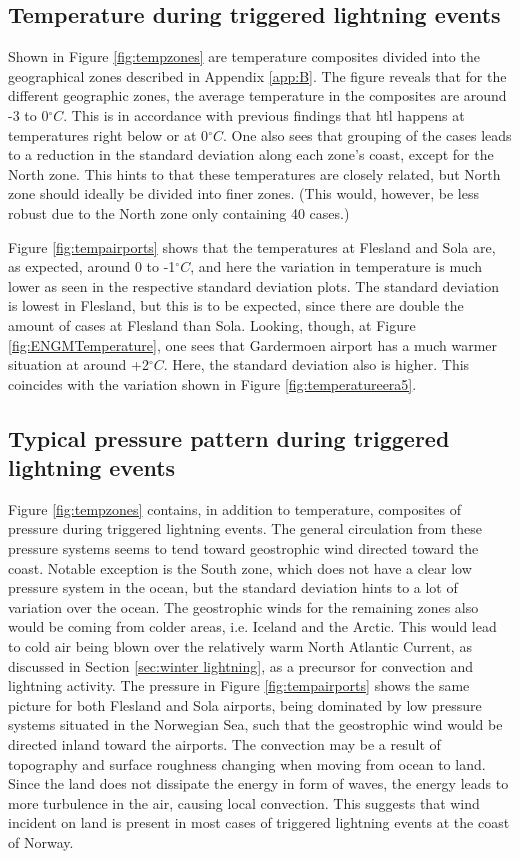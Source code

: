 \subsection{Temperature during triggered lightning events}
Shown in Figure \ref{fig:tempzones} are temperature composites divided into the geographical zones described in Appendix \ref{app:B}. The figure reveals that for the different geographic zones, the average temperature in the composites are around -3 to 0$^{\circ}C$. This is in accordance with previous findings that \acrshort{htl} happens at temperatures right below or at 0$^{\circ}C$. One also sees that grouping of the cases leads to a reduction in the standard deviation along each zone's coast, except for the North zone. This hints to that these temperatures are closely related, but North zone should ideally be divided into finer zones. (This would, however, be less robust due to the North zone only containing 40 cases.)

Figure \ref{fig:tempairports} shows that the temperatures at Flesland and Sola are, as expected, around 0 to -1$^{\circ}C$, and here the variation in temperature is much lower as seen in the respective standard deviation plots. The standard deviation is lowest in Flesland, but this is to be expected, since there are double the amount of cases at Flesland than Sola. Looking, though, at Figure \ref{fig:ENGMTemperature}, one sees that Gardermoen airport has a much warmer situation at around +2$^{\circ}C$. Here, the standard deviation also is higher. This coincides with the variation shown in Figure \ref{fig:temperatureera5}. 

\subsection{Typical pressure pattern during triggered lightning events}
Figure \ref{fig:tempzones} contains, in addition to temperature, composites of pressure during triggered lightning events. The general circulation from these pressure systems seems to tend toward geostrophic wind directed toward the coast. Notable exception is the South zone, which does not have a clear low pressure system in the ocean, but the standard deviation hints to a lot of variation over the ocean. The geostrophic winds for the remaining zones also would be coming from colder areas, i.e. Iceland and the Arctic. This would lead to cold air being blown over the relatively warm North Atlantic Current, as discussed in Section \ref{sec:winter lightning}, as a precursor for convection and lightning activity. The pressure in Figure \ref{fig:tempairports} shows the same picture for both Flesland and Sola airports, being dominated by low pressure systems situated in the Norwegian Sea, such that the geostrophic wind would be directed inland toward the airports. The convection may be a result of topography and surface roughness changing when moving from ocean to land. Since the land does not dissipate the energy in form of waves, the energy leads to more turbulence in the air, causing local convection. This suggests that wind incident on land is present in most cases of triggered lightning events at the coast of Norway. 

